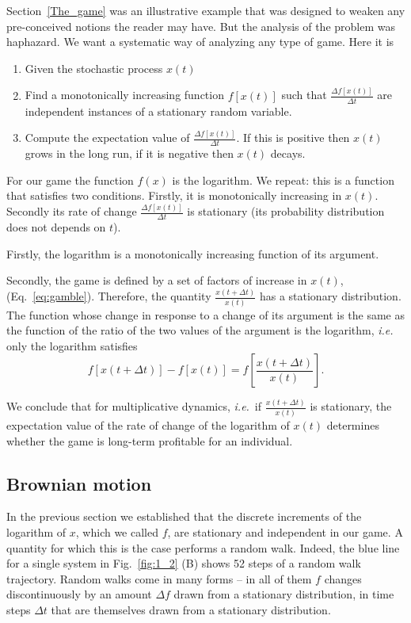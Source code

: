 \documentclass[a4paper]{article}
\newcommand{\ie}{{\it i.e.}\ }
\newcommand{\eref}[1]{(Eq.~\ref{eq:#1})}
\newcommand{\fref}[1]{Fig.~\ref{fig:#1}}
\newcommand{\be}{\begin{equation}}
\newcommand{\ee}{\end{equation}}
\begin{document}
Section~\ref{The_game} was an illustrative example that was designed to weaken any pre-conceived
notions the reader may have. But the analysis of the problem was haphazard. We want a
systematic way of analyzing any type of game. Here it is
\begin{enumerate}
\item
Given the stochastic process $x(t)$
\item
Find a monotonically increasing function $f[x(t)]$ such that $\frac{\Delta f[x(t)]}{\Delta t}$ 
are independent instances of a stationary random variable.
\item
Compute the expectation value of $\frac{\Delta f[x(t)]}{\Delta t}$. If this is positive then $x(t)$
grows in the long run, if it is negative then $x(t)$ decays.
\end{enumerate}

For our game the function $f(x)$ is the logarithm. We repeat: this is a function that satisfies 
two conditions. Firstly, it is monotonically increasing in $x(t)$. Secondly its rate of change 
$\frac{\Delta f[x(t)]}{\Delta t}$ is stationary (its probability distribution does not depends on $t$).

Firstly, the logarithm is a monotonically increasing function of its argument.

Secondly, the game is defined by a set of factors of increase in $x(t)$, \eref{gamble}. Therefore, the quantity
$\frac{x(t+\Delta t)}{x(t)}$ has a stationary distribution. The function whose change in response to a change 
of its argument is the same as the function of the ratio of the two values of the argument is the logarithm, \ie
only the logarithm satisfies
\be
f[x(t+\Delta t)]-f[x(t)]=f\left[\frac{x(t+\Delta t)}{x(t)}\right].
\ee

We conclude that for multiplicative dynamics, \ie if $\frac{x(t+\Delta t)}{x(t)}$ is stationary, the expectation 
value of the rate of change of the logarithm of $x(t)$ determines whether the game is long-term profitable 
for an individual.

\subsection{Brownian motion}
In the previous section we established that the discrete increments of the logarithm of 
$x$, which we called $f$, are stationary and independent in our game. A quantity for which this is the case performs a 
random 
walk.
Indeed, the blue line for a single system in \fref{1_2} (B) shows 52 steps of a random walk trajectory.
Random walks come in many forms -- in all of them $f$ changes discontinuously by an amount 
$\Delta f$ drawn from a stationary distribution, in time steps $\Delta t$ that are themselves 
drawn from a stationary distribution.
\end{document}
